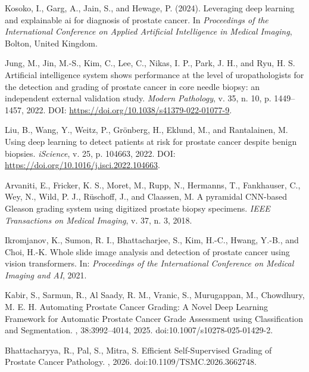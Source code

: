 Kosoko, I., Garg, A., Jain, S., and Hewage, P. (2024).
\newblock Leveraging deep learning and explainable ai for diagnosis of prostate
cancer.
\newblock In {\em Proceedings of the International Conference on Applied
	Artificial Intelligence in Medical Imaging}, Bolton, United Kingdom.
	
Jung, M., Jin, M.-S., Kim, C., Lee, C., Nikas, I. P., Park, J. H., and Ryu, H. S. 
Artificial intelligence system shows performance at the level of uropathologists for the detection and grading of prostate cancer in core needle biopsy: an independent external validation study. 
\textit{Modern Pathology}, v. 35, n. 10, p. 1449--1457, 2022. 
DOI: \url{https://doi.org/10.1038/s41379-022-01077-9}.

Liu, B., Wang, Y., Weitz, P., Grönberg, H., Eklund, M., and Rantalainen, M.
Using deep learning to detect patients at risk for prostate cancer despite benign biopsies.
\textit{iScience}, v. 25, p. 104663, 2022.
DOI: \url{https://doi.org/10.1016/j.isci.2022.104663}.

Arvaniti, E., Fricker, K. S., Moret, M., Rupp, N., Hermanns, T., Fankhauser, C., Wey, N., Wild, P. J., R{\"u}schoff, J., and Claassen, M.
A pyramidal CNN-based Gleason grading system using digitized prostate biopsy specimens.
\textit{IEEE Transactions on Medical Imaging}, v. 37, n. 3, 2018.

Ikromjanov, K., Sumon, R. I., Bhattacharjee, S., Kim, H.-C., Hwang, Y.-B., and Choi, H.-K.
Whole slide image analysis and detection of prostate cancer using vision transformers.
In: \textit{Proceedings of the International Conference on Medical Imaging and AI}, 2021.

Kabir, S., Sarmun, R., Al Saady, R. M., Vranic, S., Murugappan, M., Chowdhury, M. E. H.  
\newblock Automating Prostate Cancer Grading: A Novel Deep Learning Framework for Automatic Prostate Cancer Grade Assessment using Classification and Segmentation.  
, 38:3992--4014, 2025.  
\newblock doi:10.1007/s10278-025-01429-2.

Bhattacharyya, R., Pal, S., Mitra, S.  
\newblock Efficient Self-Supervised Grading of Prostate Cancer Pathology.  
, 2026.  
\newblock doi:10.1109/TSMC.2026.3662748.

